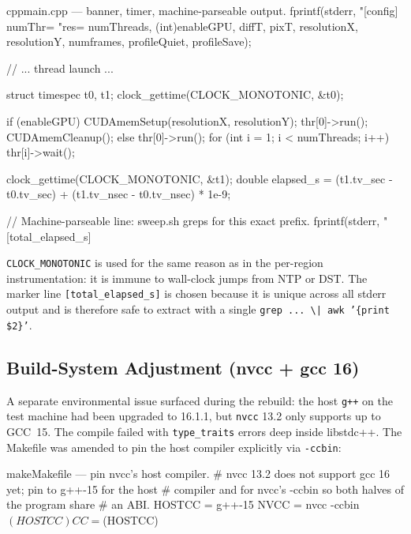 \documentclass[
	english,
	letterpaper, oneside
]{article}
\begin{document}
\begin{sourcecode}{cpp}{main.cpp --- banner, timer, machine-parseable output.}
fprintf(stderr,
        "[config] numThr=%
        "res=%
        numThreads, (int)enableGPU, diffT, pixT,
        resolutionX, resolutionY, numframes,
        profileQuiet, profileSave);

// ... thread launch ...

struct timespec t0, t1;
clock_gettime(CLOCK_MONOTONIC, &t0);

if (enableGPU) {
    CUDAmemSetup(resolutionX, resolutionY);
    thr[0]->run();
    CUDAmemCleanup();
} else {
    thr[0]->run();
}
for (int i = 1; i < numThreads; i++)
    thr[i]->wait();

clock_gettime(CLOCK_MONOTONIC, &t1);
double elapsed_s = (t1.tv_sec - t0.tv_sec)
                 + (t1.tv_nsec - t0.tv_nsec) * 1e-9;

// Machine-parseable line: sweep.sh greps for this exact prefix.
fprintf(stderr, "[total_elapsed_s] %
\end{sourcecode}

\texttt{CLOCK\_MONOTONIC} is used for the same reason as in the
per-region instrumentation: it is immune to wall-clock jumps from NTP
or DST. The marker line \texttt{[total\_elapsed\_s]} is chosen because
it is unique across all stderr output and is therefore safe to extract
with a single \texttt{grep ... \textbackslash{}| awk '\{print \$2\}'}.

\subsection{Build-System Adjustment (nvcc + gcc 16)}

A separate environmental issue surfaced during the rebuild: the host
\texttt{g++} on the test machine had been upgraded to 16.1.1, but
\texttt{nvcc} 13.2 only supports up to GCC~15. The compile failed with
\texttt{type\_traits} errors deep inside libstdc++. The Makefile was
amended to pin the host compiler explicitly via \texttt{-ccbin}:

\begin{sourcecode}{make}{Makefile --- pin nvcc's host compiler.}
# nvcc 13.2 does not support gcc 16 yet; pin to g++-15 for the host
# compiler and for nvcc's -ccbin so both halves of the program share
# an ABI.
HOSTCC    = g++-15
NVCC      = nvcc -ccbin $(HOSTCC)
CC        = $(HOSTCC)
\end{sourcecode}
\end{document}
